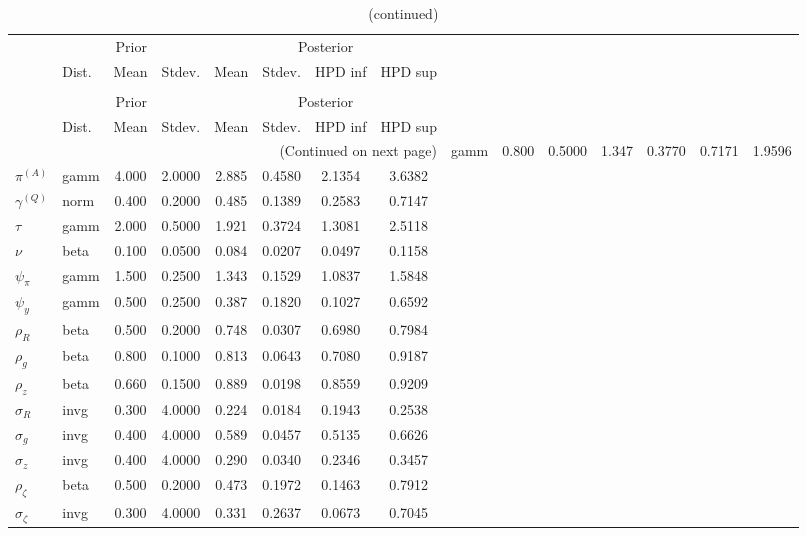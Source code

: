  
\begin{center}
\begin{longtable}{llcccccc} 
\caption{Results from Metropolis-Hastings (parameters)}
 \label{Table:MHPosterior:1}\\
\toprule 
  & \multicolumn{3}{c}{Prior}  &  \multicolumn{4}{c}{Posterior} \\
  \cmidrule(r{.75em}){2-4} \cmidrule(r{.75em}){5-8}
  & Dist. & Mean  & Stdev. & Mean & Stdev. & HPD inf & HPD sup\\
\midrule \endfirsthead 
\caption{(continued)}\\\toprule 
  & \multicolumn{3}{c}{Prior}  &  \multicolumn{4}{c}{Posterior} \\
  \cmidrule(r{.75em}){2-4} \cmidrule(r{.75em}){5-8}
  & Dist. & Mean  & Stdev. & Mean & Stdev. & HPD inf & HPD sup\\
\midrule \endhead 
\bottomrule \multicolumn{8}{r}{(Continued on next page)} \endfoot 
\bottomrule \endlastfoot 
${r_{A}}$ & gamm &   0.800 & 0.5000 &   1.347& 0.3770 &  0.7171 &  1.9596 \\ 
${\pi^{(A)}}$ & gamm &   4.000 & 2.0000 &   2.885& 0.4580 &  2.1354 &  3.6382 \\ 
${\gamma^{(Q)}}$ & norm &   0.400 & 0.2000 &   0.485& 0.1389 &  0.2583 &  0.7147 \\ 
${\tau}$ & gamm &   2.000 & 0.5000 &   1.921& 0.3724 &  1.3081 &  2.5118 \\ 
${\nu}$ & beta &   0.100 & 0.0500 &   0.084& 0.0207 &  0.0497 &  0.1158 \\ 
${\psi_\pi}$ & gamm &   1.500 & 0.2500 &   1.343& 0.1529 &  1.0837 &  1.5848 \\ 
${\psi_y}$ & gamm &   0.500 & 0.2500 &   0.387& 0.1820 &  0.1027 &  0.6592 \\ 
${\rho_R}$ & beta &   0.500 & 0.2000 &   0.748& 0.0307 &  0.6980 &  0.7984 \\ 
${\rho_{g}}$ & beta &   0.800 & 0.1000 &   0.813& 0.0643 &  0.7080 &  0.9187 \\ 
${\rho_z}$ & beta &   0.660 & 0.1500 &   0.889& 0.0198 &  0.8559 &  0.9209 \\ 
${\sigma_R}$ & invg &   0.300 & 4.0000 &   0.224& 0.0184 &  0.1943 &  0.2538 \\ 
${\sigma_{g}}$ & invg &   0.400 & 4.0000 &   0.589& 0.0457 &  0.5135 &  0.6626 \\ 
${\sigma_z}$ & invg &   0.400 & 4.0000 &   0.290& 0.0340 &  0.2346 &  0.3457 \\ 
${\rho_\zeta}$ & beta &   0.500 & 0.2000 &   0.473& 0.1972 &  0.1463 &  0.7912 \\ 
${\sigma_\zeta}$ & invg &   0.300 & 4.0000 &   0.331& 0.2637 &  0.0673 &  0.7045 \\ 
\end{longtable}
 \end{center}
